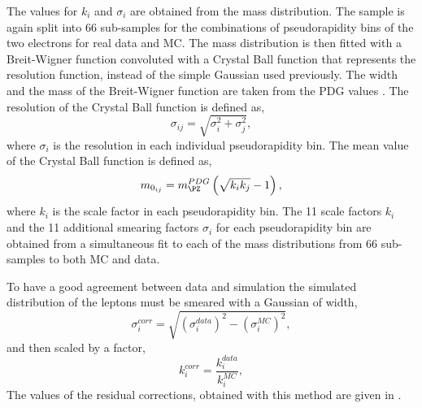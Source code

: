 The values for $k_{i}$ and $\sigma_{i}$ are obtained from the
\HepProcess{\PZ\to\Pe\Pe} mass distribution. The \HepProcess{\PZ\to\Pe\Pe}
sample is again split into 66 sub-samples for the combinations of
pseudorapidity bins of the two electrons for real data
and {MC}.  The \HepProcess{\PZ\to\Pe\Pe} mass distribution is then fitted with a
Breit-Wigner function convoluted with a Crystal Ball function that represents
the resolution function, instead of the simple Gaussian used previously. The
width and the mass of the Breit-Wigner function are taken from the PDG values
\cite{beringer2012review}. The resolution of the Crystal Ball function is
defined as,
\begin{equation}
\sigma_{ij} = \sqrt{\sigma_{i}^{2} + \sigma_{j}^{2}} ,
\end{equation}
where $\sigma_{i}$ is the resolution in each individual pseudorapidity bin.
The mean value of the Crystal Ball function is defined as,
\begin{equation}
m_{0_{ij}} = m_{\PZ}^{PDG} 
          \left( \sqrt{k_{i} k_{j}} - 1 \right) ,
\end{equation}
where $k_{i}$ is the scale factor in each pseudorapidity bin.  The 11 scale
factors $k_{i}$ and the 11 additional smearing factors $\sigma_{i}$ for each
pseudorapidity bin are obtained from a simultaneous fit to each of the mass
distributions from 66 sub-samples to both {MC} and data. 

To have a good agreement between data and simulation the simulated \pT
distribution of the leptons must be smeared with a Gaussian of width,
\begin{equation}
\sigma^{corr}_{i} = 
\sqrt{
\left(\sigma^{data}_{i}\right)^{2} -
\left(\sigma^{MC}_{i}  \right)^{2} 
},
\end{equation}
and then scaled by a factor,
\begin{equation}
k^{corr}_i = \frac{ k^{data}_i}{k^{MC}_i} ,
\end{equation}
The values of the
residual corrections, obtained with this method are given in
.

